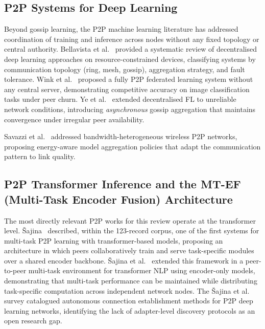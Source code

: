 \subsection{P2P Systems for Deep Learning}
\label{sec:p2p_federated:p2p_dl}

Beyond gossip learning, the P2P machine learning literature has addressed coordination
of training and inference across nodes without any fixed topology or central authority.
Bellavista et al.~\cite{BellavistaDL2021} provided a systematic review of decentralised deep learning
approaches on resource-constrained devices, classifying systems by communication
topology (ring, mesh, gossip), aggregation strategy, and fault tolerance. Wink et al.~\cite{WinkP2PFL2021}
proposed a fully P2P federated learning system without any central server, demonstrating
competitive accuracy on image classification tasks under peer churn. Ye et al.~\cite{YeDecentralizedFL2022}
extended decentralised FL to unreliable network conditions, introducing
\textit{asynchronous} gossip aggregation that maintains convergence under irregular
peer availability.

Savazzi et al.~\cite{Savazzi2020} addressed bandwidth-heterogeneous wireless P2P networks, proposing
energy-aware model aggregation policies that adapt the communication pattern to link
quality.

\subsection{P2P Transformer Inference and the MT-EF (Multi-Task Encoder Fusion) Architecture}
\label{sec:p2p_federated:p2p_transformer}

The most directly relevant P2P works for this review operate at the transformer level.
{\v{S}}ajina~\cite{Sajina2025} described, within the 123-record corpus, one of the first systems for multi-task P2P learning with
transformer-based models, proposing an architecture in which peers collaboratively
train and serve task-specific modules over a shared encoder backbone. {\v{S}}ajina et al.~\cite{Sajina2024}
extended this framework in a peer-to-peer multi-task environment for transformer NLP
using encoder-only models, demonstrating that multi-task performance can be maintained
while distributing task-specific computation across independent network nodes. The
{\v{S}}ajina et al.~\cite{SajinaP2PConnection2024} survey catalogued autonomous connection establishment
methods for P2P deep learning networks, identifying the lack of adapter-level discovery
protocols as an open research gap.

